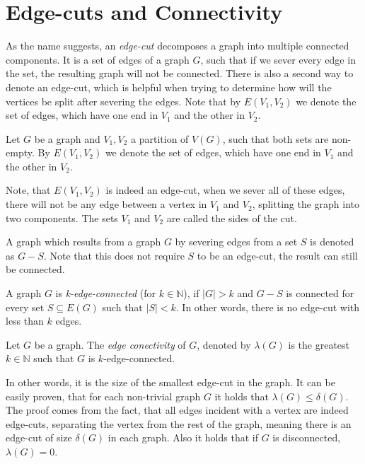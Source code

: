\documentclass[12pt, twoside]{book}
\begin{document}

\section{Edge-cuts and Connectivity}\label{sec:edge-cuts}

As the name suggests, an \textit{edge-cut} decomposes a graph into multiple connected components. It is a set of edges of a graph $G$, such that if we sever every edge in the set, the resulting graph will not be connected. There is also a second way to denote an edge-cut, which is helpful when trying to determine how will the vertices be split after severing the edges. Note that by $E(V_1,V_2)$ we denote the set of edges, which have one end in $V_1$ and the other in $V_2$.

Let $G$ be a graph and ${V_1,V_2}$ a partition of $V(G)$, such that both sets are non-empty. By $E(V_1,V_2)$ we denote the set of edges, which have one end in $V_1$ and the other in $V_2$.

Note, that $E(V_1,V_2)$ is indeed an edge-cut, when we sever all of these edges, there will not be any edge between a vertex in $V_1$ and $V_2$, splitting the graph into two components. The sets $V_1$ and $V_2$ are called the sides of the cut.

A graph which results from a graph $G$ by severing edges from a set $S$ is denoted as $G-S$. Note that this does not require $S$ to be an edge-cut, the result can still be connected.

A graph $G$ is \textit{k-edge-connected} (for $k\in\mathbb{N}$), if $|G|>k$ and $G-S$ is connected for every set $S\subseteq E(G)$ such that $|S|<k$. In other words, there is no edge-cut with less than $k$ edges.

\begin{definition}
	Let $G$ be a graph. The \textit{edge conectivity} of $G$, denoted by $\lambda(G)$ is the greatest $k\in\mathbb{N}$ such that $G$ is $k$-edge-connected.
\end{definition}

In other words, it is the size of the smallest edge-cut in the graph. It can be easily proven, that for each non-trivial graph $G$ it holds that $\lambda(G)\leq\delta(G)$. The proof comes from the fact, that all edges incident with a vertex are indeed edge-cuts, separating the vertex from the rest of the graph, meaning there is an edge-cut of size $\delta(G)$ in each graph. Also it holds that if $G$ is disconnected, $\lambda(G)=0$.
\end{document}
